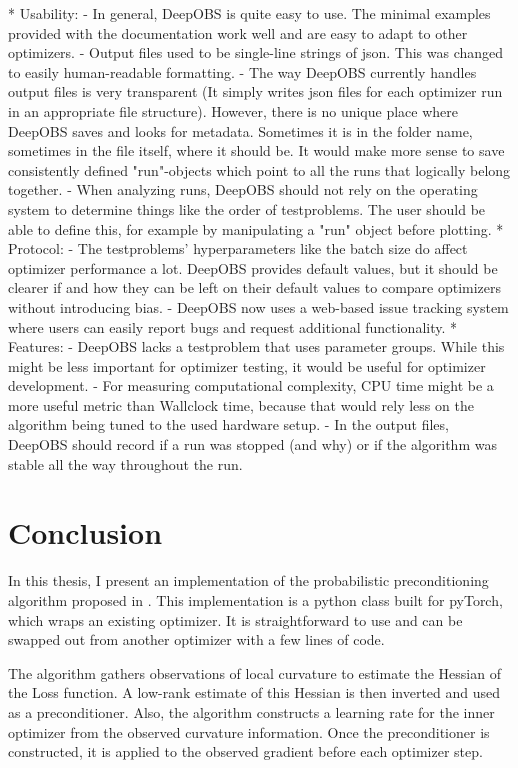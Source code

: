 \documentclass[twoside,12pt,a4paper]{report}
\begin{document}
\begin{markdown}
* Usability:
	- In general, DeepOBS is quite easy to use. The minimal examples provided with the documentation work well and are easy to adapt to other optimizers.
	- Output files used to be single-line strings of json. This was changed to easily human-readable formatting.
	- The way DeepOBS currently handles output files is very transparent (It simply writes json files for each optimizer run in an appropriate file structure). However, there is no unique place where DeepOBS saves and looks for metadata. Sometimes it is in the folder name, sometimes in the file itself, where it should be. It would make more sense to save consistently defined "run"-objects which point to all the runs that logically belong together.
	- When analyzing runs, DeepOBS should not rely on the operating system to determine things like the order of testproblems. The user should be able to define this, for example by manipulating a "run" object before plotting.
* Protocol: 
	- The testproblems' hyperparameters like the batch size do affect optimizer performance a lot. DeepOBS provides default values, but it should be clearer if and how they can be left on their default values to compare optimizers without introducing bias.
	- DeepOBS now uses a web-based issue tracking system where users can easily report bugs and request additional functionality.
* Features:
	- DeepOBS lacks a testproblem that uses parameter groups. While this might be less important for optimizer testing, it would be useful for optimizer development.
	- For measuring computational complexity, CPU time might be a more useful metric than Wallclock time, because that would rely less on the algorithm being tuned to the used hardware setup.
	- In the output files, DeepOBS should record if a run was stopped (and why) or if the algorithm was stable all the way throughout the run.
\end{markdown}

\chapter{Conclusion}
In this thesis, I present an implementation of the probabilistic preconditioning algorithm proposed in \cite{roos2019active}. This implementation is a python class built for pyTorch, which wraps an existing optimizer. It is straightforward to use and can be swapped out from another optimizer with a few lines of code.

The algorithm gathers observations of local curvature to estimate the Hessian of the Loss function.
A low-rank estimate of this Hessian is then inverted and used as a preconditioner. Also, the algorithm constructs a learning rate for the inner optimizer from the observed curvature information.
Once the preconditioner is constructed, it is applied to the observed gradient before each optimizer step.
\end{document}
